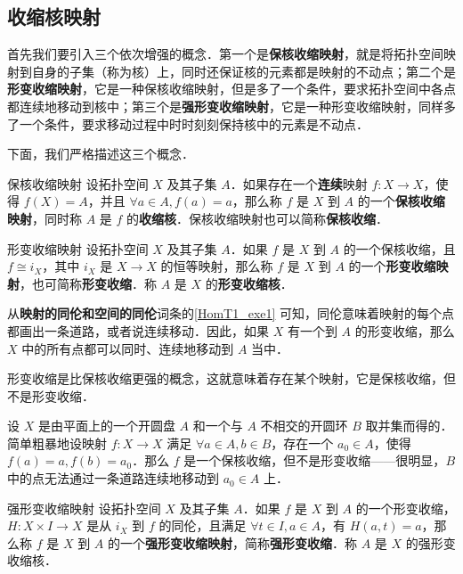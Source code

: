 

\subsection{收缩核映射}

首先我们要引入三个依次增强的概念．第一个是\textbf{保核收缩映射}，就是将拓扑空间映射到自身的子集（称为核）上，同时还保证核的元素都是映射的不动点；第二个是\textbf{形变收缩映射}，它是一种保核收缩映射，但是多了一个条件，要求拓扑空间中各点都连续地移动到核中；第三个是\textbf{强形变收缩映射}，它是一种形变收缩映射，同样多了一个条件，要求移动过程中时时刻刻保持核中的元素是不动点．

下面，我们严格描述这三个概念．

\begin{definition}{保核收缩映射}
设拓扑空间 $X$ 及其子集 $A$．如果存在一个\textbf{连续}映射 $f:X\rightarrow X$，使得 $f(X)=A$，并且 $\forall a\in A, f(a)=a$，那么称 $f$ 是 $X$ 到 $A$ 的一个\textbf{保核收缩映射}，同时称 $A$ 是 $f$ 的\textbf{收缩核}．保核收缩映射也可以简称\textbf{保核收缩}．
\end{definition}

\begin{definition}{形变收缩映射}
设拓扑空间 $X$ 及其子集 $A$．如果 $f$ 是 $X$ 到 $A$ 的一个保核收缩，且 $f\cong i_X$，其中 $i_X$ 是 $X\rightarrow X$ 的恒等映射，那么称 $f$ 是 $X$ 到 $A$ 的一个\textbf{形变收缩映射}，也可简称\textbf{形变收缩}．称 $A$ 是 $X$ 的\textbf{形变收缩核}．
\end{definition}

从\textbf{映射的同伦和空间的同伦}词条的\autoref{HomT1_exe1} 可知，同伦意味着映射的每个点都画出一条道路，或者说连续移动．因此，如果 $X$ 有一个到 $A$ 的形变收缩，那么 $X$ 中的所有点都可以同时、连续地移动到 $A$ 当中．

形变收缩是比保核收缩更强的概念，这就意味着存在某个映射，它是保核收缩，但不是形变收缩．

\begin{example}{}
设 $X$ 是由平面上的一个开圆盘 $A$ 和一个与 $A$ 不相交的开圆环 $B$ 取并集而得的．简单粗暴地设映射 $f:X\rightarrow X$ 满足 $\forall a\in A, b\in B$，存在一个 $a_0\in A$，使得 $f(a)=a, f(b)=a_0$．那么 $f$ 是一个保核收缩，但不是形变收缩——很明显，$B$ 中的点无法通过一条道路连续地移动到 $a_0\in A$ 上．
\end{example}

\begin{definition}{强形变收缩映射}\label{HomT2_def1}
设拓扑空间 $X$ 及其子集 $A$．如果 $f$ 是 $X$ 到 $A$ 的一个形变收缩，$H:X\times I\rightarrow X$ 是从 $i_X$ 到 $f$ 的同伦，且满足 $\forall t\in I, a\in A$，有 $H(a, t)=a$，那么称 $f$ 是 $X$ 到 $A$ 的一个\textbf{强形变收缩映射}，简称\textbf{强形变收缩}．称 $A$ 是 $X$ 的强形变收缩核．
\end{definition}

